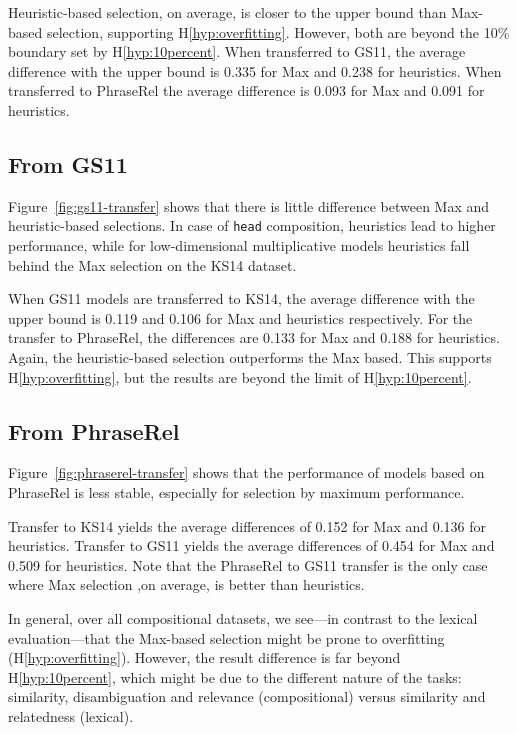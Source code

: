 Heuristic-based selection, on average, is closer to the upper bound than Max-based selection, supporting H\ref{hyp:overfitting}. However, both are beyond the 10\% boundary set by H\ref{hyp:10percent}. When transferred to GS11, the average difference with the upper bound is 0.335 for Max and 0.238 for heuristics. When transferred to PhraseRel the average difference is 0.093 for Max and 0.091 for heuristics.

\subsection{From GS11}
\label{sec:from-gs11}



Figure~\ref{fig:gs11-transfer} shows that there is little difference between Max and heuristic-based selections. In case of \texttt{head} composition, heuristics lead to higher performance, while for low-dimensional multiplicative models heuristics fall behind the Max selection on the KS14 dataset.

When GS11 models are transferred to KS14, the average difference with the upper bound is 0.119 and 0.106 for Max and heuristics respectively. For the transfer to PhraseRel, the differences are 0.133 for Max and 0.188 for heuristics. Again, the heuristic-based selection outperforms the Max based. This supports H\ref{hyp:overfitting}, but the results are beyond the limit of H\ref{hyp:10percent}.

\subsection{From PhraseRel}
\label{sec:from-phraserel}



Figure~\ref{fig:phraserel-transfer} shows that the performance of models based on PhraseRel is less stable, especially for selection by maximum performance.

Transfer to KS14 yields the average differences of 0.152 for Max and 0.136 for heuristics. Transfer to GS11 yields the average differences of 0.454 for Max and 0.509 for heuristics. Note that the PhraseRel to GS11 transfer is the only case where Max selection ,on average, is better than heuristics.

In general, over all compositional datasets, we see---in contrast to the lexical evaluation---that the Max-based selection might be prone to overfitting (H\ref{hyp:overfitting}). However, the result difference is far beyond H\ref{hyp:10percent}, which might be due to the different nature of the tasks: similarity, disambiguation and relevance (compositional) versus similarity and relatedness (lexical).
%
%

